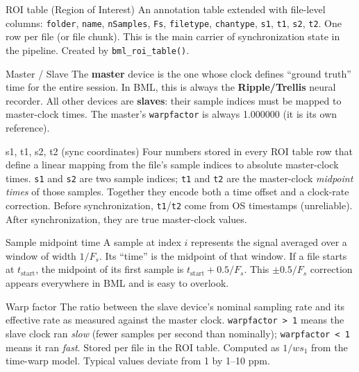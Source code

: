 \documentclass[11pt, a4paper]{article}
\begin{document}
\begin{glossentry}{ROI table (Region of Interest)}
An annotation table extended with file-level columns: \texttt{folder}, \texttt{name}, \texttt{nSamples}, \texttt{Fs}, \texttt{filetype}, \texttt{chantype}, \texttt{s1}, \texttt{t1}, \texttt{s2}, \texttt{t2}. One row per file (or file chunk). This is the main carrier of synchronization state in the pipeline. Created by \texttt{bml\_roi\_table()}.
\end{glossentry}

\begin{glossentry}{Master / Slave}
The \textbf{master} device is the one whose clock defines ``ground truth'' time for the entire session. In BML, this is always the \textbf{Ripple/Trellis} neural recorder. All other devices are \textbf{slaves}: their sample indices must be mapped to master-clock times. The master's \texttt{warpfactor} is always 1.000000 (it is its own reference).
\end{glossentry}

\begin{glossentry}{s1, t1, s2, t2 (sync coordinates)}
Four numbers stored in every ROI table row that define a linear mapping from the file's sample indices to absolute master-clock times. \texttt{s1} and \texttt{s2} are two sample indices; \texttt{t1} and \texttt{t2} are the master-clock \emph{midpoint times} of those samples. Together they encode both a time offset and a clock-rate correction. Before synchronization, \texttt{t1}/\texttt{t2} come from OS timestamps (unreliable). After synchronization, they are true master-clock values.
\end{glossentry}

\begin{glossentry}{Sample midpoint time}
A sample at index $i$ represents the signal averaged over a window of width $1/F_s$. Its ``time'' is the midpoint of that window. If a file starts at $t_{\text{start}}$, the midpoint of its first sample is $t_{\text{start}} + 0.5/F_s$. This $\pm 0.5/F_s$ correction appears everywhere in BML and is easy to overlook.
\end{glossentry}

\begin{glossentry}{Warp factor}
The ratio between the slave device's nominal sampling rate and its effective rate as measured against the master clock. \texttt{warpfactor > 1} means the slave clock ran \emph{slow} (fewer samples per second than nominally); \texttt{warpfactor < 1} means it ran \emph{fast}. Stored per file in the ROI table. Computed as $1/ws_1$ from the time-warp model. Typical values deviate from 1 by 1--10 ppm.
\end{glossentry}
\end{document}
